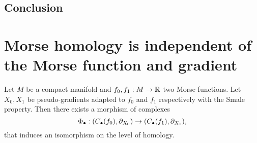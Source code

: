\subsection{Conclusion}



\section{Morse homology is independent of the Morse function and gradient}
\begin{theorem}
    Let $M$ be a compact manifold and $ f_0, f_1: M \to  \mathbb{R}$ two Morse functions.
    Let $X_0, X_1$ be pseudo-gradients adapted to $f_0$ and $ f_1$ respectively with the Smale property.
    Then there exists a morphism of complexes
    \[
        \Phi_{\bullet}:
        (C_\bullet(f_0), \partial_{X_0}) \to  
        (C_\bullet(f_1), \partial_{X_1})
    ,\] 
    that induces an isomorphism on the level of homology.
\end{theorem}
    
